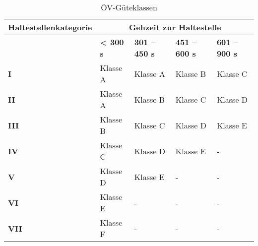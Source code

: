 \begin{table}[H]
    \begin{tabular}[c]{l p{2.6cm} p{2.6cm} p{2.6cm} p{2.6cm}}
        \toprule
        \textbf{Haltestellenkategorie}
                                & \multicolumn{4}{c}{\textbf{Gehzeit zur Haltestelle}}\\
        \midrule
        \textbf{}
                                & \textbf{< 300 s}
                                & \textbf{301 -- 450 s}
                                & \textbf{451 -- 600 s}
                                & \textbf{601 -- 900 s}\\
        \textbf{I}
                                & Klasse A
                                & Klasse A
                                & Klasse B
                                & Klasse C\\
        \textbf{II}
                                & Klasse A
                                & Klasse B
                                & Klasse C
                                & Klasse D\\
        \textbf{III}
                                & Klasse B
                                & Klasse C
                                & Klasse D
                                & Klasse E\\
        \textbf{IV}
                                & Klasse C
                                & Klasse D
                                & Klasse E
                                & -\\
        \textbf{V}
                                & Klasse D
                                & Klasse E
                                & -
                                & -\\
        \textbf{VI}
                                & Klasse E
                                & -
                                & -
                                & -\\
        \textbf{VII}
                                & Klasse F
                                & -
                                & -
                                & -\\                                
        \bottomrule
    \end{tabular}
    \caption{ÖV-Güteklassen}
    \label{table:ÖV-Güteklassen}
\end{table}
